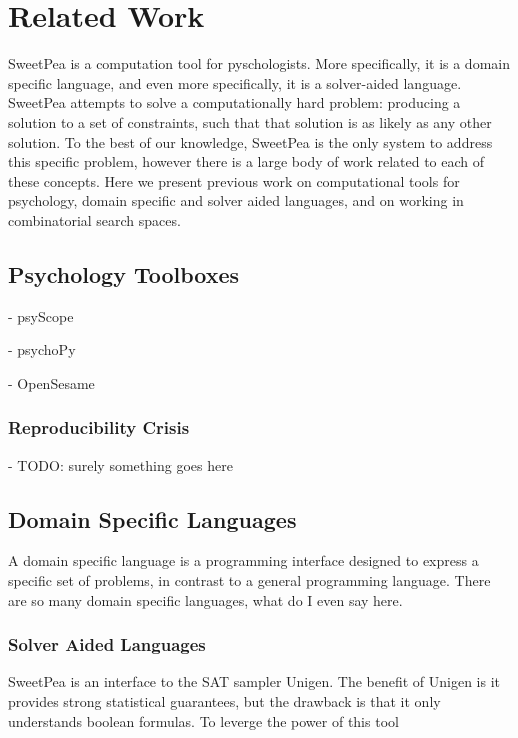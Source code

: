 

\chapter{Related Work}

SweetPea is a computation tool for pyschologists. More specifically, it is a domain specific language, and even more specifically, it is a solver-aided language. SweetPea attempts to solve a computationally hard problem: producing a solution to a set of constraints, such that that solution is as likely as any other solution. To the best of our knowledge, SweetPea is the only system to address this specific problem, however there is a large body of work related to each of these concepts. Here we present previous work on computational tools for psychology, domain specific and solver aided languages, and on working in combinatorial search spaces.

\section{Psychology Toolboxes}

- psyScope \cite{cohen1993psyscope}

- psychoPy \cite{mathot2012opensesame}

- OpenSesame \cite{peirce2009generating}

\subsection{Reproducibility Crisis}

- TODO: surely something goes here

\section{Domain Specific Languages}

A domain specific language is a programming interface designed to express a specific set of problems, in contrast to a general programming language. There are so many domain specific languages, what do I even say here.

\subsection{Solver Aided Languages}

SweetPea is an interface to the SAT sampler Unigen. The benefit of Unigen is it provides strong statistical guarantees, but the drawback is that it only understands boolean formulas. To leverge the power of this tool

